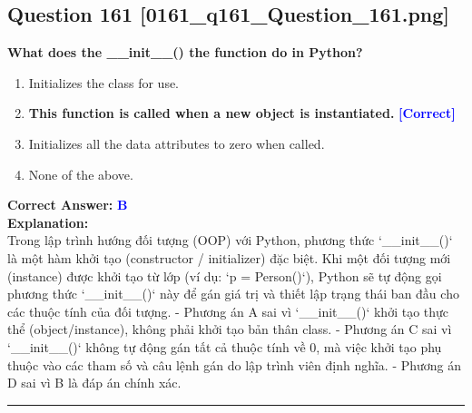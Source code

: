 \documentclass[11pt,a4paper]{article}
\begin{document}
\begin{minipage}{\textwidth}
\subsection*{Question 161 \quad \footnotesize{[0161_q161_Question_161.png]}}
\noindent \textbf{What does the __init__() the function do in Python?}

\begin{enumerate}[label=\Alph*.]
    \item Initializes the class for use.
    \item \textbf{This function is called when a new object is instantiated.} \hfill \textcolor{blue}{\textbf{[Correct]}}
    \item Initializes all the data attributes to zero when called.
    \item None of the above.
\end{enumerate}

\noindent \textbf{Correct Answer:} \textcolor{blue}{\textbf{B}} \\[4pt]
\noindent \textbf{Explanation:}\\
Trong lập trình hướng đối tượng (OOP) với Python, phương thức `__init__()` là một hàm khởi tạo (constructor / initializer) đặc biệt. Khi một đối tượng mới (instance) được khởi tạo từ lớp (ví dụ: `p = Person()`), Python sẽ tự động gọi phương thức `__init__()` này để gán giá trị và thiết lập trạng thái ban đầu cho các thuộc tính của đối tượng.\newline
- Phương án A sai vì `__init__()` khởi tạo thực thể (object/instance), không phải khởi tạo bản thân class.\newline
- Phương án C sai vì `__init__()` không tự động gán tất cả thuộc tính về 0, mà việc khởi tạo phụ thuộc vào các tham số và câu lệnh gán do lập trình viên định nghĩa.\newline
- Phương án D sai vì B là đáp án chính xác.
\end{minipage}
\vspace{0.8cm}
\hrule
\vspace{0.5cm}
\end{document}
